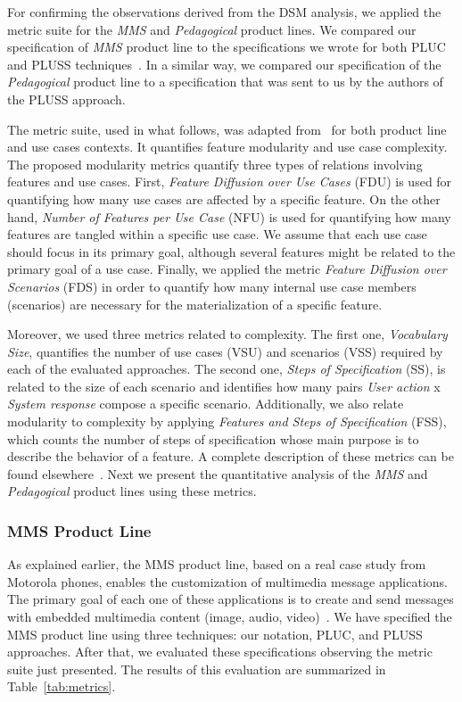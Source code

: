 \documentclass[11pt]{report}
\begin{document}
For confirming the observations derived from the DSM analysis, we applied the metric suite for 
the \emph{MMS} and \emph{Pedagogical} product lines. We compared our specification of \emph{MMS} product line to the specifications we wrote for both PLUC and PLUSS techniques~\cite{spg-url}.  
In a similar way, we compared our specification of the \emph{Pedagogical} product line 
to a specification that was sent to us by the authors of the PLUSS approach. 

The metric suite, used in what follows, was adapted from~\cite{garcia-taosd-2005} for both product line 
and use cases contexts. It quantifies 
feature modularity and use case complexity. The proposed modularity 
metrics quantify three types of relations involving features and use cases.
First, \emph{Feature Diffusion over Use Cases} (FDU) is used for
quantifying how many use cases are affected by a specific
feature. On the other hand, \emph{Number of Features per Use Case} (NFU) is used for quantifying
how many features are tangled within a specific use
case. We assume that each use case should focus in
its primary goal, although several features might be related
to the primary goal of a use case. Finally, we applied
the metric \emph{Feature Diffusion over Scenarios} (FDS) in order
to quantify how many internal use case members (scenarios)
are necessary for the materialization of a specific feature.
 
Moreover, we used three metrics related to complexity.
The first one, \emph{Vocabulary Size}, quantifies the number of use
cases (VSU) and scenarios (VSS) required by each of the evaluated
approaches. The second one, \emph{Steps of Specification}
(SS), is related to the size of each scenario and identifies
how many pairs \emph{User action} x \emph{System response} compose a
specific scenario. Additionally, we also relate modularity to
complexity by applying \emph{Features and Steps of Specification}
(FSS), which counts the number of steps of specification
whose main purpose is to describe the behavior of a feature. 
A complete description of these metrics can be found elsewhere~\cite{rbonifacio-ea-2008}. Next we 
present the quantitative analysis of the \emph{MMS} and \emph{Pedagogical} product lines using these metrics.

\subsubsection{MMS Product Line}

As explained earlier, the MMS product line, based on a real case study from Motorola phones, enables the customization of 
multimedia message applications. The primary goal of each one of these applications is to create and 
send messages with embedded multimedia content (image, audio, video)~\cite{rbonifacio-ea-2008}. 
We have specified the MMS product line using three techniques: our notation, PLUC, and PLUSS approaches. After that, we evaluated these specifications observing the metric suite just presented. The results of this evaluation are summarized in Table~\ref{tab:metrics}. 
\end{document}

